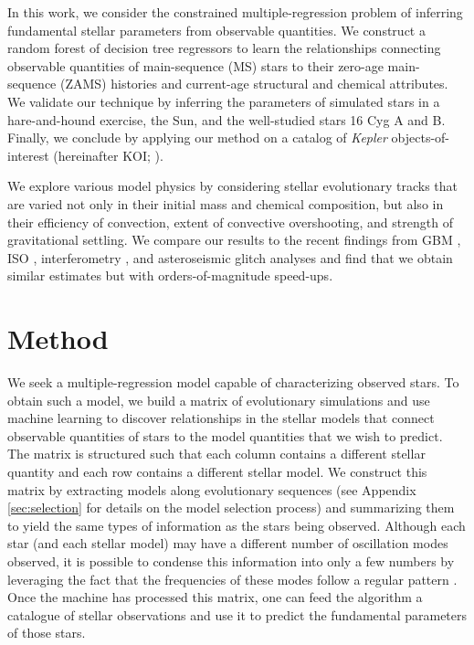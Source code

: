 \documentclass[manuscript,linenumbers]{aastex6}
\newif\ifref
\newcommand{\mb}[1]{\ifref\boldmath\textbf{#1}\unboldmath\else #1\fi}
\begin{document}
In this work, we consider the constrained multiple-regression problem of inferring fundamental stellar \mb{parameters} from observable \mb{quantities}. We construct a random forest of decision tree regressors to learn the relationships connecting observable quantities of main-sequence (MS) stars to their zero-age main-sequence (ZAMS) histories and  current-age structural and chemical attributes. We validate our technique by inferring the parameters of simulated stars in a hare-and-hound exercise, the Sun, and the well-studied stars 16 Cyg A and B. Finally, we conclude by applying our method on a catalog of \emph{Kepler} objects-of-interest (hereinafter KOI; \citealt{2016MNRAS.456.2183D}).  

We explore various model physics by considering stellar evolutionary tracks that are varied not only in their initial mass and chemical composition, but also in their efficiency of convection, extent of convective overshooting, and strength of gravitational settling. We compare our results to the recent findings from GBM \citep{2015MNRAS.452.2127S}, ISO \citep{2015ApJ...811L..37M}, interferometry \citep{2013MNRAS.433.1262W}, and asteroseismic glitch analyses \citep{2014ApJ...790..138V} and find that we obtain similar estimates but with orders-of-magnitude speed-ups. 


\section{Method} \label{sec:Method} 
We seek a multiple-regression model capable of characterizing observed stars. To obtain such a model, we build a matrix of evolutionary simulations and use machine learning to discover relationships in the \mb{stellar models} that connect observable quantities of stars to the model quantities that we wish to predict. \mb{The matrix is structured such that each column contains a different stellar quantity and each row contains a different stellar model.} We construct this matrix by extracting models along evolutionary sequences (see Appendix \ref{sec:selection} for details on the model selection process) and summarizing them to yield the same types of information as the stars being observed. Although each star (and each stellar model) may have a different number of \mb{oscillation} modes observed, it is possible to condense this information into only a few numbers by leveraging the fact that the frequencies of these modes follow a regular pattern \citep[for a review of solar-like oscillations, see][]{doi:10.1146/annurev-astro-082812-140938}. Once the machine has processed this matrix, one can feed the algorithm a catalogue of \mb{stellar observations} and use it to predict the \mb{fundamental} parameters of those stars.
\end{document}
